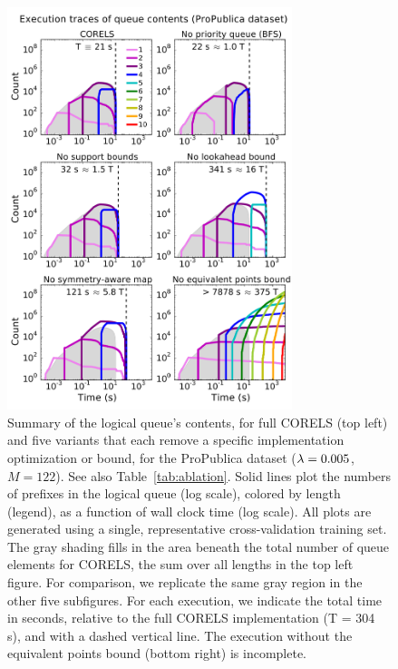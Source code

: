 \begin{figure}[t!]
\begin{center}
\includegraphics[trim={0mm 0mm 0mm 5mm}, width=0.74\textwidth]{figs/jmlr_compas_ablation-queue.pdf}
\end{center}
\vspace{-5mm}
\caption{Summary of the logical queue's contents, for full CORELS (top left)
and five variants that each remove a specific implementation optimization or bound,
for the ProPublica dataset (${{\lambda} = 0.005}$, ${M = 122}$).  See also Table~\ref{tab:ablation}.
%
Solid lines plot the numbers of prefixes in the logical queue (log scale), colored by length (legend),
as a function of wall clock time (log scale).
%
All plots are generated using a single, representative cross-validation training set.
%
The gray shading fills in the area beneath the total number of
queue elements for CORELS,
\ie the sum over all lengths in the top left figure.
%
For comparison, we replicate the same gray region
in the other five subfigures.
%
For each execution, we indicate the total time in seconds,
relative to the full CORELS implementation (T = 304 s),
and with a dashed vertical line.
%
The execution without the equivalent points bound (bottom right) is incomplete.
}
\label{fig:queue}
\end{figure}


